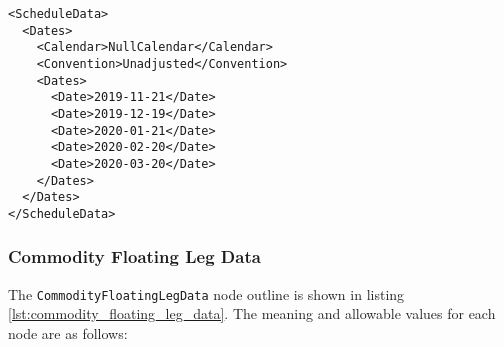 \begin{listing}[h!]
\begin{verbatim}
<ScheduleData>
  <Dates>
    <Calendar>NullCalendar</Calendar>
    <Convention>Unadjusted</Convention>
    <Dates>
      <Date>2019-11-21</Date>
      <Date>2019-12-19</Date>
      <Date>2020-01-21</Date>
      <Date>2020-02-20</Date>
      <Date>2020-03-20</Date>
    </Dates>
  </Dates>
</ScheduleData>
\end{verbatim}
\caption{\textnormal{\lstinline!ScheduleData!} node for explicit periods.}
\label{lst:comm_schedule_explicit}
\end{listing}

\subsubsection{Commodity Floating Leg Data}
\label{ss:commodity_floating_leg_data}
The \lstinline!CommodityFloatingLegData! node outline is shown in listing \ref{lst:commodity_floating_leg_data}. The meaning and allowable values for each node are as follows:

